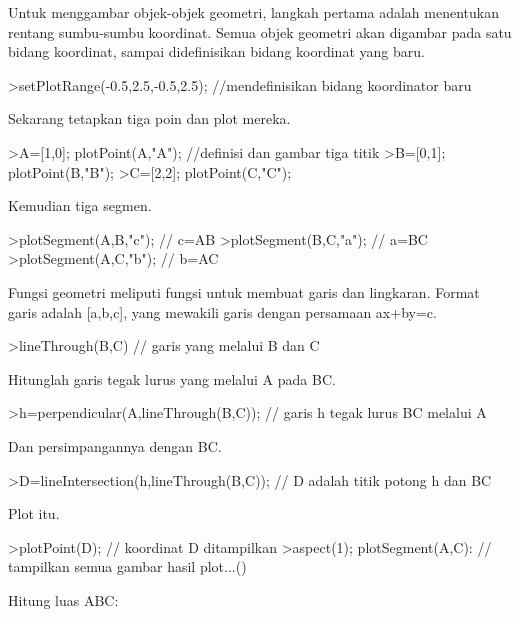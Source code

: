 \documentclass{article}
\begin{document}
\begin{eulernotebook}
\begin{eulercomment}
\end{eulercomment}
\begin{eulercomment}
Untuk menggambar objek-objek geometri, langkah pertama adalah menentukan rentang sumbu-sumbu
koordinat. Semua objek geometri akan digambar pada satu bidang koordinat, sampai didefinisikan
bidang koordinat yang baru.
\end{eulercomment}
\begin{eulerprompt}
>setPlotRange(-0.5,2.5,-0.5,2.5); //mendefinisikan bidang koordinator baru
\end{eulerprompt}
\begin{eulercomment}
Sekarang tetapkan tiga poin dan plot mereka.
\end{eulercomment}
\begin{eulerprompt}
>A=[1,0]; plotPoint(A,"A"); //definisi dan gambar tiga titik
>B=[0,1]; plotPoint(B,"B");
>C=[2,2]; plotPoint(C,"C");
\end{eulerprompt}
\begin{eulercomment}
Kemudian tiga segmen.
\end{eulercomment}
\begin{eulerprompt}
>plotSegment(A,B,"c"); // c=AB
>plotSegment(B,C,"a"); // a=BC
>plotSegment(A,C,"b"); // b=AC
\end{eulerprompt}
\begin{eulercomment}
Fungsi geometri meliputi fungsi untuk membuat garis dan lingkaran.
Format garis adalah [a,b,c], yang mewakili garis dengan persamaan
ax+by=c.
\end{eulercomment}
\begin{eulerprompt}
>lineThrough(B,C) // garis yang melalui B dan C
\end{eulerprompt}
\begin{euleroutput}
  [-1,  2,  2]
\end{euleroutput}
\begin{eulercomment}
Hitunglah garis tegak lurus yang melalui A pada BC.
\end{eulercomment}
\begin{eulerprompt}
>h=perpendicular(A,lineThrough(B,C)); // garis h tegak lurus BC melalui A
\end{eulerprompt}
\begin{eulercomment}
Dan persimpangannya dengan BC.
\end{eulercomment}
\begin{eulerprompt}
>D=lineIntersection(h,lineThrough(B,C)); // D adalah titik potong h dan BC
\end{eulerprompt}
\begin{eulercomment}
Plot itu.
\end{eulercomment}
\begin{eulerprompt}
>plotPoint(D); // koordinat D ditampilkan
>aspect(1); plotSegment(A,C): // tampilkan semua gambar hasil plot...()
\end{eulerprompt}
\begin{eulercomment}
Hitung luas ABC:


\end{eulercomment}
\end{eulernotebook}
\end{document}
